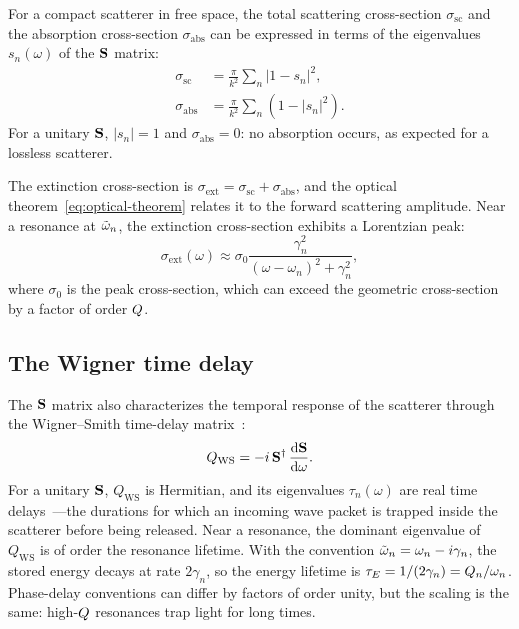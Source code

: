 For a compact scatterer in free space, the total scattering cross-section
$\sigma_{\mathrm{sc}}$ and the absorption cross-section
$\sigma_{\mathrm{abs}}$ can be expressed in terms of the eigenvalues
$s_n(\omega)$ of the $\mathbf{S}$ matrix:
\begin{align}
 \sigma_{\mathrm{sc}} &= \frac{\pi}{k^2}\sum_n |1 - s_n|^2,
 \label{eq:sigma-sc}\\
 \sigma_{\mathrm{abs}} &= \frac{\pi}{k^2}\sum_n (1 - |s_n|^2).
 \label{eq:sigma-abs}
\end{align}
For a unitary $\mathbf{S}$, $|s_n| = 1$ and $\sigma_{\mathrm{abs}} = 0$: no
absorption occurs, as expected for a lossless scatterer.

The extinction cross-section is
$\sigma_{\mathrm{ext}} = \sigma_{\mathrm{sc}} + \sigma_{\mathrm{abs}}$,
and the optical theorem~\eqref{eq:optical-theorem} relates it to the
forward scattering amplitude. Near a resonance at $\tilde{\omega}_n$, the
extinction cross-section exhibits a Lorentzian peak:
\begin{equation}
 \sigma_{\mathrm{ext}}(\omega) \approx \sigma_0
 \frac{\gamma_n^2}{(\omega - \omega_n)^2 + \gamma_n^2},
 \label{eq:resonant-extinction}
\end{equation}
where $\sigma_0$ is the peak cross-section, which can exceed the
geometric cross-section by a factor of order $Q$.

\subsection{The Wigner time delay}
\label{ssec:wigner-delay}

The $\mathbf{S}$ matrix also characterizes the temporal response of the
scatterer through the Wigner--Smith time-delay matrix~\cite{raman2010photonic,unknown2018phys}:
\begin{equation}
 Q_{\mathrm{WS}} = -i\,\mathbf{S}^\dagger\,\frac{\mathop{}\!\mathrm{d} \mathbf{S}}{\mathop{}\!\mathrm{d} \omega}.
 \label{eq:wigner-smith}
\end{equation}
For a unitary $\mathbf{S}$, $Q_{\mathrm{WS}}$ is Hermitian, and its
eigenvalues $\tau_n(\omega)$ are real time delays~\cite{lasson2014roundtrip}---the durations for
which an incoming wave packet is trapped inside the scatterer before
being released. Near a resonance, the dominant eigenvalue of
$Q_{\mathrm{WS}}$ is of order the resonance lifetime. With the convention
$\tilde{\omega}_n=\omega_n-i\gamma_n$, the stored energy decays at rate
$2\gamma_n$, so the energy lifetime is
$\tau_E=1/(2\gamma_n)=Q_n/\omega_n$. Phase-delay conventions can
differ by factors of order unity, but the scaling is the same:
high-$Q$ resonances trap light for long times.

